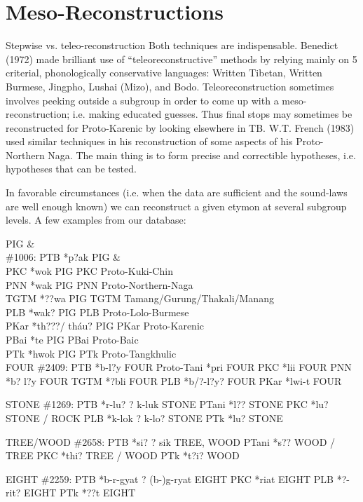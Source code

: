 \section{Meso-Reconstructions}

Stepwise vs. teleo-reconstruction
Both techniques are indispensable. Benedict (1972) made brilliant use of “teleoreconstructive” methods by relying mainly on 5 criterial, phonologically conservative languages: Written Tibetan, Written Burmese, Jingpho, Lushai (Mizo), and Bodo. Teleoreconstruction sometimes involves peeking outside a subgroup in order to come up with a meso-reconstruction; i.e. making educated guesses. Thus final stops may sometimes be reconstructed for Proto-Karenic by looking elsewhere in TB. W.T. French (1983) used similar techniques in his reconstruction of some aspects of his Proto-Northern Naga. The main thing is to form precise and correctible hypotheses, i.e. hypotheses that can be tested.

In favorable circumstances (i.e. when the data are sufficient and the sound-laws are well enough known) we can reconstruct a given etymon at several subgroup levels. A few examples from our database: 

PIG \& \\
\#1006: PTB *p?ak PIG \& \\
PKC *wok PIG	PKC	Proto-Kuki-Chin \\
PNN *wak PIG 	PNN	Proto-Northern-Naga\\
TGTM *??wa PIG 	TGTM	Tamang/Gurung/Thakali/Manang\\
PLB *wak? PIG 	PLB	Proto-Lolo-Burmese\\
PKar *th???/ tháu?  PIG	PKar	Proto-Karenic\\
PBai *te PIG 	PBai	Proto-Baic\\
PTk *hwok PIG	  PTk	Proto-Tangkhulic\\

FOUR
\#2409: PTB *b-l?y FOUR
Proto-Tani *pri FOUR
PKC *lii FOUR
PNN *b? l?y FOUR
TGTM *?bli FOUR
PLB *b/?-l?y? FOUR
PKar *lwi-t FOUR

STONE
\#1269: PTB *r-lu? ? k-luk STONE
PTani *l?? STONE
PKC *lu? STONE / ROCK
PLB *k-lok ? k-lo? STONE
PTk *lu? STONE

TREE/WOOD
\#2658: PTB *si? ? sik TREE, WOOD
PTani *s?? WOOD / TREE
PKC *thi? TREE / WOOD
PTk *t?i? WOOD

EIGHT
\#2259: PTB *b-r-gyat ? (b-)g-ryat EIGHT
PKC *riat EIGHT
PLB *?-rit? EIGHT
PTk *??t EIGHT

